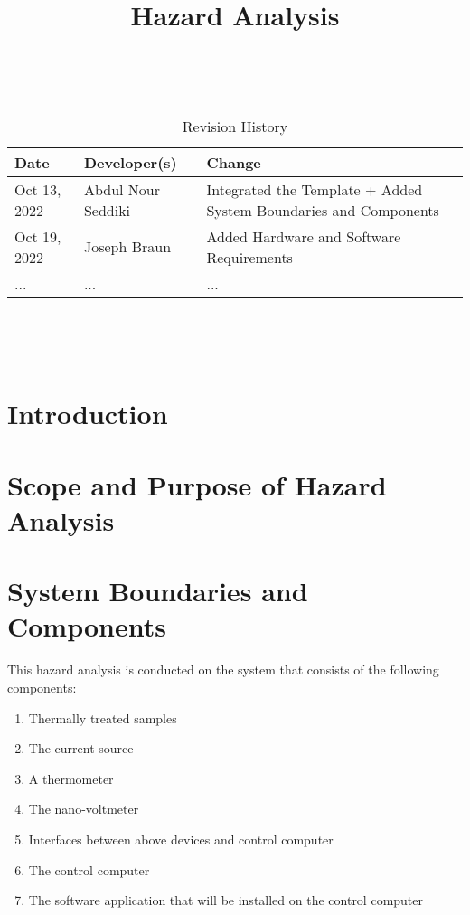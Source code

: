 \documentclass{article}
\title{Hazard Analysis\\\progname}
\author{\authname}
\date{}
\begin{document}
\maketitle
\thispagestyle{empty}

~\newpage


\begin{table}[hp]
\caption{Revision History} \label{TblRevisionHistory}
\begin{tabularx}{\textwidth}{llX}
\toprule
\textbf{Date} & \textbf{Developer(s)} & \textbf{Change}\\
\midrule
Oct 13, 2022 & Abdul Nour Seddiki & Integrated the Template + Added System Boundaries and Components\\
Oct 19, 2022 & Joseph Braun & Added Hardware and Software Requirements \\
... & ... & ...\\
\bottomrule
\end{tabularx}
\end{table}

~\newpage

\tableofcontents

~\newpage



\section{Introduction}


\section{Scope and Purpose of Hazard Analysis}

\section{System Boundaries and Components}

\noindent This hazard analysis is conducted on the system that consists of the following components:

\begin{enumerate}
  \item Thermally treated samples
  \item The current source
  \item A thermometer
  \item The nano-voltmeter
  \item Interfaces between above devices and control computer
  \item The control computer
  \item The software application that will be installed on the control computer
\end{enumerate}
\end{document}
